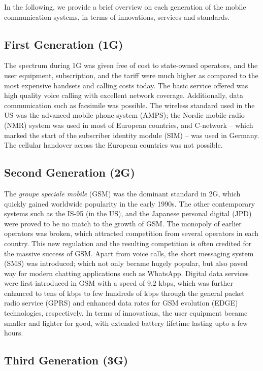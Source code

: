 \begin{multicols}{2}
In the following, we provide a brief overview on each generation of the mobile communication systems, in terms of innovations, services and standards.

\subsection{First Generation (1G)} \label{SubSec_1G}

The spectrum during 1G was given free of cost to state-owned operators, and the user equipment, subscription, and the tariff were much higher as compared to the most expensive handsets and calling costs today. The basic service offered was high quality voice calling with excellent network coverage. Additionally, data communication such as facsimile was possible. The wireless standard used in the US was the advanced mobile phone system (AMPS); the Nordic mobile radio (NMR) system was used in most of European countries, and C-network -- which marked the start of the subscriber identity module (SIM) -- was used in Germany. The cellular handover across the European countries was not possible.

\subsection{Second Generation (2G)} \label{SubSec_2G}

The \emph{groupe speciale mobile} (GSM) was the dominant standard in 2G, which quickly gained worldwide popularity in the early 1990s. The other contemporary systems such as the IS-95 (in the US), and the Japanese personal digital (JPD) were proved to be no match to the growth of GSM. The monopoly of earlier operators was broken, which attracted competition from several operators in each country. This new regulation and the resulting competition is often credited for the massive success of GSM. Apart from voice calls, the short messaging system (SMS) was introduced; which not only became hugely popular, but also paved way for modern chatting applications such as WhatsApp. Digital data services were first introduced in GSM with a speed of $9.2$ kbps, which was further enhanced to tens of kbps to few hundreds of kbps through the general packet radio service (GPRS) and enhanced data rates for GSM evolution (EDGE) technologies, respectively. In terms of innovations, the user equipment became smaller and lighter for good, with extended battery lifetime lasting upto a few hours.

\subsection{Third Generation (3G)} \label{SubSec_3G}


\end{multicols}
